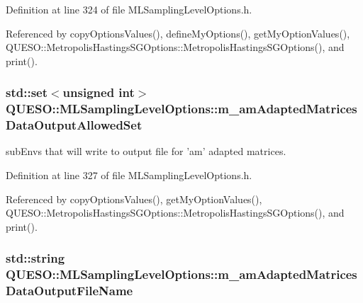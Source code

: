 Definition at line 324 of file M\-L\-Sampling\-Level\-Options.\-h.



Referenced by copy\-Options\-Values(), define\-My\-Options(), get\-My\-Option\-Values(), Q\-U\-E\-S\-O\-::\-Metropolis\-Hastings\-S\-G\-Options\-::\-Metropolis\-Hastings\-S\-G\-Options(), and print().

\hypertarget{class_q_u_e_s_o_1_1_m_l_sampling_level_options_a7bab0713dca38607204e38ce661799bb}{
\subsubsection[{m\-\_\-am\-Adapted\-Matrices\-Data\-Output\-Allowed\-Set}]{\setlength{\rightskip}{0pt plus 5cm}std\-::set$<$unsigned int$>$ Q\-U\-E\-S\-O\-::\-M\-L\-Sampling\-Level\-Options\-::m\-\_\-am\-Adapted\-Matrices\-Data\-Output\-Allowed\-Set}}\label{class_q_u_e_s_o_1_1_m_l_sampling_level_options_a7bab0713dca38607204e38ce661799bb}


sub\-Envs that will write to output file for 'am' adapted matrices. 



Definition at line 327 of file M\-L\-Sampling\-Level\-Options.\-h.



Referenced by copy\-Options\-Values(), get\-My\-Option\-Values(), Q\-U\-E\-S\-O\-::\-Metropolis\-Hastings\-S\-G\-Options\-::\-Metropolis\-Hastings\-S\-G\-Options(), and print().

\hypertarget{class_q_u_e_s_o_1_1_m_l_sampling_level_options_a7dde9af112143992a87a72635e63a864}{
\subsubsection[{m\-\_\-am\-Adapted\-Matrices\-Data\-Output\-File\-Name}]{\setlength{\rightskip}{0pt plus 5cm}std\-::string Q\-U\-E\-S\-O\-::\-M\-L\-Sampling\-Level\-Options\-::m\-\_\-am\-Adapted\-Matrices\-Data\-Output\-File\-Name}}\label{class_q_u_e_s_o_1_1_m_l_sampling_level_options_a7dde9af112143992a87a72635e63a864}


